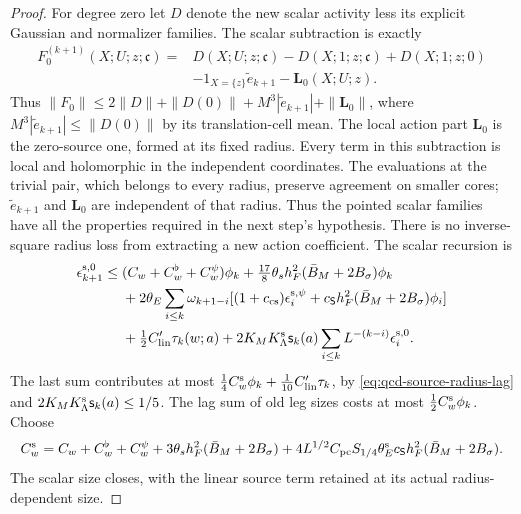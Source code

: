 \documentclass[11pt,letterpaper,reqno]{amsart}
\theoremstyle{definition}
\theoremstyle{remark}
\begin{document}
\begin{proof}
For degree zero let $D$ denote the new scalar activity
less its explicit Gaussian and normalizer families.
The scalar subtraction is exactly
\[
\begin{split}
 F_0^{(k+1)}(X;U;z;\mathfrak c)={}&D(X;U;z;\mathfrak c)
      -D(X;1;z;\mathfrak c)+D(X;1;z;0)\\
 &-1_{X=\{z\}}\widetilde e_{k+1}-\mathbf L_0(X;U;z).
\end{split}
\]
Thus $\|F_0\|\le2\|D\|+\|D(0)\|+
M^3|\widetilde e_{k+1}|+\|\mathbf L_0\|$, where
$M^3|\widetilde e_{k+1}|\le\|D(0)\|$ by its translation-cell
mean. The local action part $\mathbf L_0$ is the zero-source
one, formed at its fixed radius.
Every term in this subtraction is local and holomorphic
in the independent coordinates. The evaluations at the
trivial pair, which belongs to every radius, preserve
agreement on smaller cores; $\widetilde e_{k+1}$ and
$\mathbf L_0$ are independent of that radius. Thus the
pointed scalar families have all the properties required
in the next step's hypothesis.
There is no inverse-square radius loss from extracting a
new action coefficient. The scalar recursion is
\[
\begin{split}
 \epsilon_{k+1}^{{\rm s},0}\le{}&
 (C_w+C_w^\flat+C_w^\psi)\phi_k
 +\tfrac{17}8\theta_sh_F^2(\bar B_M+2B_\sigma)\phi_k\\
 &+2\theta_E\sum_{i\le k}\omega_{k+1-i}
 [(1+c_{\rm cs})\epsilon_i^{{\rm s},\psi}
       +c_{\mathsf S}h_F^2(\bar B_M+2B_\sigma)\phi_i]\\
 &+\tfrac12C'_{\rm lin}\tau_k(w;a)
 +2K_MK_\Lambda^{\rm s}\mathsf s_k(a)
                     \sum_{i\le k}L^{-(k-i)}\epsilon_i^{{\rm s},0}.
\end{split}
\]
The last sum contributes at most
$\frac14C_w^{\rm s}\phi_k+
\tfrac1{10}C'_{\rm lin}\tau_k$,
by \eqref{eq:qcd-source-radius-lag} and
$2K_MK_\Lambda^{\rm s}\mathsf s_k(a)\le1/5$.
The lag sum of old leg sizes costs at most
$\frac12C_w^{\rm s}\phi_k$. Choose
\[
 C_w^{\rm s}=C_w+C_w^\flat+C_w^\psi+
 3\theta_sh_F^2(\bar B_M+2B_\sigma)+
 4L^{1/2}C_{\rm pc}S_{1/4}\theta_E^{\rm s}c_{\mathsf S}h_F^2
                                  (\bar B_M+2B_\sigma).
\]
The scalar size closes, with the linear source term retained
at its actual radius-dependent size.


\end{proof}
\end{document}
